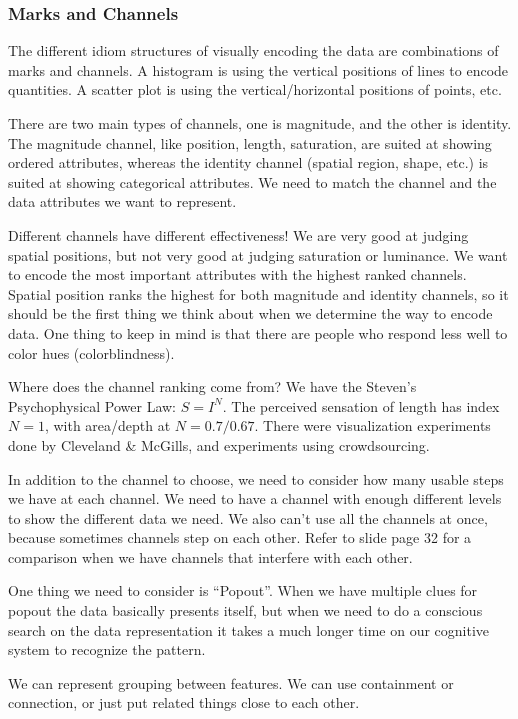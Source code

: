 \documentclass[letterpaper, 11pt]{article}
\numberwithin{equation}{section}
\numberwithin{figure}{section}
\begin{document}
\subsubsection{Marks and Channels}

The different idiom structures of visually encoding the data are combinations of
marks and channels. A histogram is using the vertical positions of lines to
encode quantities. A scatter plot is using the vertical/horizontal positions of
points, etc.

There are two main types of channels, one is magnitude, and the other is
identity. The magnitude channel, like position, length, saturation, are suited
at showing ordered attributes, whereas the identity channel (spatial region,
shape, etc.) is suited at showing categorical attributes. We need to match the
channel and the data attributes we want to represent.

Different channels have different effectiveness! We are very good at judging
spatial positions, but not very good at judging saturation or luminance. We want
to encode the most important attributes with the highest ranked channels.
Spatial position ranks the highest for both magnitude and identity channels, so
it should be the first thing we think about when we determine the way to encode
data. One thing to keep in mind is that there are people who respond less well
to color hues (colorblindness).

Where does the channel ranking come from? We have the Steven's Psychophysical
Power Law: $S = I^N$. The perceived sensation of length has index $N=1$, with
area/depth at $N=0.7/0.67$. There were visualization experiments done by
Cleveland \& McGills, and experiments using crowdsourcing.

In addition to the channel to choose, we need to consider how many usable steps
we have at each channel. We need to have a channel with enough different levels
to show the different data we need. We also can't use all the channels at once,
because sometimes channels step on each other. Refer to slide page 32 for a
comparison when we have channels that interfere with each other.

One thing we need to consider is ``Popout''. When we have multiple clues for
popout the data basically presents itself, but when we need to do a conscious
search on the data representation it takes a much longer time on our cognitive
system to recognize the pattern.

We can represent grouping between features. We can use containment or
connection, or just put related things close to each other.
\end{document}
